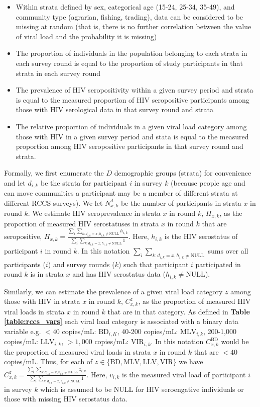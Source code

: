 \documentclass{article}[11pt]
\begin{document}
\begin{itemize}
    \item Within strata defined by sex, categorical age (15-24, 25-34, 35-49), and community type (agrarian, fishing, trading), data can be considered to be missing at random (that is, there is no further correlation between the value of viral load and the probability it is missing) 
    \item The proportion of individuals in the population belonging to each strata in each survey round is equal to the proportion of study participants in that strata in each survey round
    \item The prevalence of HIV seropositivity within a given survey period and strata is equal to the measured proportion of HIV seropositive participants among those with HIV serological data in that survey round and strata
    \item The relative proportion of individuals in a given viral load category among those with HIV in a given survey period and stata is equal to the measured proportion among HIV seropositive participants in that survey round and strata.
\end{itemize}

Formally, we first enumerate the $D$ demographic groups (strata) for convenience and let $d_{i,k}$ be the strata for participant $i$ in survey $k$ (because people age and can move communities a participant may be a member of different strata at different RCCS surveys). We let $N^d_{x,k}$ be the number of participants in strata $x$ in round $k$. We estimate HIV seroprevalence in strata $x$ in round $k$, $H_{x,k}$, as the proportion of measured HIV serostatuses in strata $x$ in round $k$ that are seropositive, $H_{x,k} = \frac{\sum_i \sum_{k:d_{i,k}=x, h_{i,k} \neq \text{NULL}}h_{i,k}}{\sum_i \sum_{k:d_{i,k}=x, h_{i,k} \neq \text{NULL}} 1}$. Here, $h_{i,k}$ is the HIV serostatus of participant $i$ in round $k$. In this notation $\sum_i\sum_{k:d_{i,k}=x, h_{i,k} \neq \text{NULL}}$ sums over all participants ($i$) and survey rounds ($k$) such that participant $i$ participated in round $k$ is in strata $x$ and has HIV serostatus data ($h_{i,k} \neq \text{NULL}$).

Similarly, we can estimate the prevalence of a given viral load category $z$ among those with HIV in strata $x$ in round $k$, $C^z_{x,k}$, as the proportion of measured HIV viral loads in strata $x$ in round $k$ that are in that category. As defined in \textbf{Table \ref{table:rccs_vars}} each viral load category is associated with a binary data variable e.g. $<40$ copies/mL: $\text{BD}_{i,K}$, 40-200 copies/mL: $\text{MLV}_{i,k}$, 200-1,000 copies/mL: $\text{LLV}_{i,k}$, $>1,000$ copies/mL: $\text{VIR}_{i,k}$. In this notation $C^\text{BD}_{x,k}$ would be the proportion of measured viral loads in strata $x$ in round $k$ that are $<40$ copies/mL. Thus, for each of $z \in \{\text{BD}, \text{MLV}, \text{LLV}, \text{VIR}\}$ we have $C^z_{x,k} = \frac{\sum_i \sum_{k:d_{i,k}=x, v_{i,k} \neq \text{NULL}} z_{i,k}}{\sum_i \sum_{k:d_{i,k}=x, v_{i,k} \neq \text{NULL}} 1}$. Here, $v_{i,k}$ is the measured viral load of participant $i$ in survey $k$ which is assumed to be NULL for HIV seroengative individuals or those with missing HIV serostatus data. 
\end{document}

